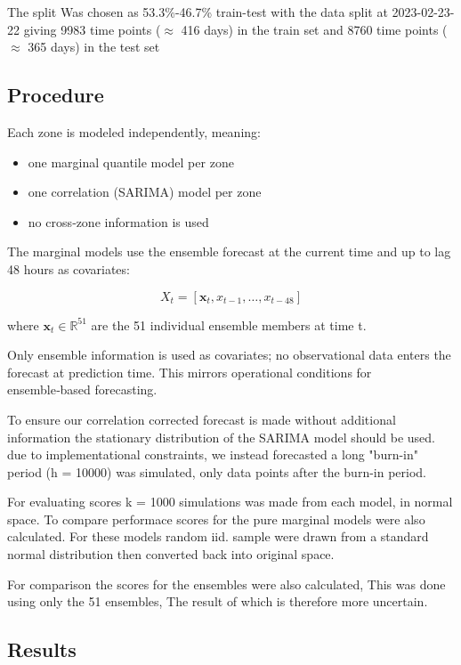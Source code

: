 The split Was chosen as 53.3\%-46.7\% train-test with the data split at 2023-02-23-22 giving 9983 time points ($\approx$ 416 days) in the train set and 8760 time points ($\approx$ 365 days) in the test set

\subsection{Procedure}
Each zone is modeled independently, meaning:

\begin{itemize}
    \item one marginal quantile model per zone
    \item one correlation (SARIMA) model per zone
    \item no cross‑zone information is used
\end{itemize}

The marginal models use the ensemble forecast at the current time and up to lag 48 hours as covariates:

\[
X_t = [\mathbf{x}_t, x_{t-1},\dots, x_{t-48}]
\]

where  $\mathbf{x}_t \in\mathbb{R}^{51} $ are the 51 individual ensemble members at time t.

Only ensemble information is used as covariates; no observational data enters the forecast at prediction time. This mirrors operational conditions for ensemble‑based forecasting.

To ensure our correlation corrected forecast is made without additional information the stationary distribution of the SARIMA model should be used. due to implementational constraints, we instead forecasted a long "burn-in" period (h = 10000) was simulated, only data points after the burn-in period.

For evaluating scores k = 1000 simulations was made from each model, in normal space. To compare performace scores for the pure marginal models were also calculated. For these models random iid. sample were drawn from a standard normal distribution then converted back into original space.

For comparison the scores for the ensembles were also calculated, This was done using only the 51 ensembles, The result of which is therefore more uncertain.

\subsection{Results}

